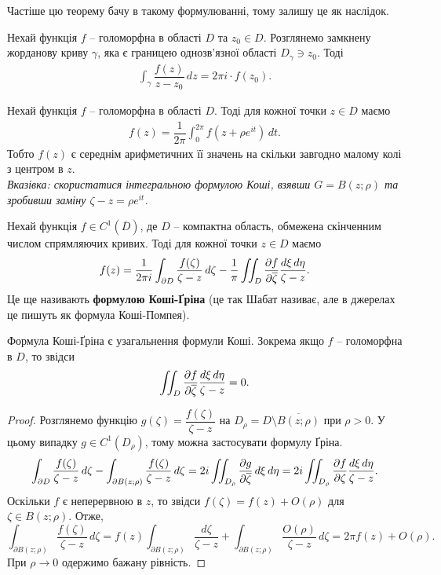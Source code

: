 \documentclass{math_library}
\begin{document}
Частіше цю теорему бачу в такому формулюванні, тому залишу це як наслідок.
\begin{corollary}
Нехай функція $f$ -- голоморфна в області $D$ та $z_0 \in D$. Розглянемо замкнену жорданову криву $\gamma$, яка є границею однозв'язної області $D_\gamma \ni z_0$. Тоді
\begin{align*}
\int_{\gamma} \dfrac{f(z)}{z-z_0}\,dz = 2\pi i \cdot f(z_0).
\end{align*}
\end{corollary}

\begin{corollary}
Нехай функція $f$ -- голоморфна в області $D$. Тоді для кожної точки $z \in D$ маємо
\begin{align*}
f(z) = \dfrac{1}{2\pi} \int_0^{2\pi} f(z + \rho e^{it})\,dt.
\end{align*}
Тобто $f(z)$ є середнім арифметичних її значень на скільки завгодно малому колі з центром в $z$.\\
\textit{Вказівка: скористатися інтегральною формулою Коші, взявши $G = B(z;\rho)$ та зробивши заміну $\zeta - z = \rho e^{it}$.}
\end{corollary}

\begin{theorem}
Нехай функція $f \in C^1(\overline{D})$, де $D$ -- компактна область, обмежена скінченним числом спрямляючих кривих. Тоді для кожної точки $z \in D$ маємо
\begin{align*}
f(z) = \dfrac{1}{2\pi i} \int_{\partial D} \dfrac{f(\zeta)}{\zeta - z}\,d\zeta - \dfrac{1}{\pi} \iint_D \dfrac{\partial {f}}{\partial {\overline{\zeta}}} \dfrac{d\xi\,d\eta}{\zeta-z}.
\end{align*}
Це ще називають \textbf{формулою Коші-Ґріна} (це так Шабат називає, але в джерелах це пишуть як формула Коші-Помпея).
\end{theorem}

\begin{remark}
Формула Коші-Ґріна є узагальнення формули Коші. Зокрема якщо $f$ -- голоморфна в $D$, то звідси
\begin{align*}
\iint_D \dfrac{\partial {f}}{\partial {\overline{\zeta}}} \dfrac{d\xi\, d\eta}{\zeta-z} = 0.
\end{align*}
\end{remark}

\begin{proof}
Розглянемо функцію $g(\zeta) = \dfrac{f(\zeta)}{\zeta-z}$ на $D_\rho = D \setminus \overline{B(z;\rho)}$ при $\rho > 0$. У цьому випадку $g \in C^1(D_\rho)$, тому можна застосувати формулу Ґріна.
\[
\int_{\partial D} \dfrac{f(\zeta)}{\zeta-z}\,d\zeta - \int_{\partial B(z;\rho)} \dfrac{f(\zeta)}{\zeta-z}\,d\zeta = 2i \iint_{D_\rho} \dfrac{\partial {g}}{\partial {\overline{\zeta}}}\,d\xi\,d\eta = 2i \iint_{D_\rho} \dfrac{\partial {f}}{\partial {\zeta}} \dfrac{d\xi\,d\eta}{\zeta-z}.
\]
Оскільки $f$ є неперервною в $z$, то звідси $f(\zeta) = f(z) + O(\rho)$ для $\zeta \in B(z;\rho)$. Отже,
\[
\int_{\partial B(z;\rho)} \dfrac{f(\zeta)}{\zeta - z}\,d\zeta = f(z) \int_{\partial B(z;\rho)} \dfrac{d\zeta}{\zeta-z} + \int_{\partial B(z;\rho)} \dfrac{O(\rho)}{\zeta - z}\,d\zeta = 2\pi f(z) + O(\rho).
\]
При $\rho \to 0$ одержимо бажану рівність.
\end{proof}
\newpage
\end{document}

